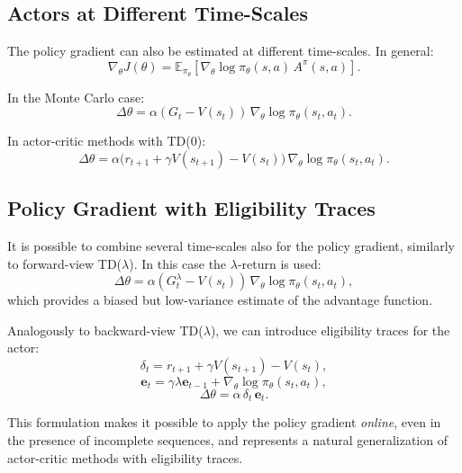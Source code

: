 \subsection{Actors at Different Time-Scales}

The policy gradient can also be estimated at different time-scales. In general:
\[
\nabla_\theta J(\theta)
= \mathbb{E}_{\pi_\theta}
\left[
\nabla_\theta \log \pi_\theta(s,a)\, A^\pi(s,a)
\right].
\]

In the Monte Carlo case:
\[
\Delta \theta
= \alpha (G_t - V(s_t))\, \nabla_\theta \log \pi_\theta(s_t,a_t).
\]

In actor-critic methods with TD(0):
\[
\Delta \theta
= \alpha \big(r_{t+1}
+ \gamma V(s_{t+1})
- V(s_t)\big)\,
\nabla_\theta \log \pi_\theta(s_t,a_t).
\]

\subsection{Policy Gradient with Eligibility Traces}

It is possible to combine several time-scales also for the policy gradient, similarly to forward-view TD($\lambda$). In this case the $\lambda$-return is used:
\[
\Delta \theta
= \alpha (G_t^\lambda - V(s_t))\,
\nabla_\theta \log \pi_\theta(s_t,a_t),
\]
which provides a biased but low-variance estimate of the advantage function.

Analogously to backward-view TD($\lambda$), we can introduce eligibility traces for the actor:
\[
\delta_t = r_{t+1} + \gamma V(s_{t+1}) - V(s_t),
\]
\[
\mathbf{e}_t = \gamma \lambda \mathbf{e}_{t-1} + \nabla_\theta \log \pi_\theta(s_t,a_t),
\]
\[
\Delta \theta = \alpha\, \delta_t\, \mathbf{e}_t.
\]

This formulation makes it possible to apply the policy gradient \emph{online}, even in the presence of incomplete sequences, and represents a natural generalization of actor-critic methods with eligibility traces.
